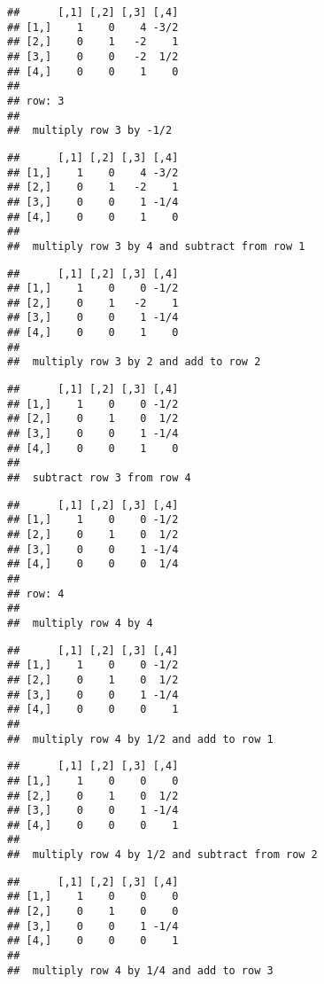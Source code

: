\documentclass[
  10pt,
  a4paper,
]{article}
\begin{document}
\begin{verbatim}
##      [,1] [,2] [,3] [,4]
## [1,]    1    0    4 -3/2
## [2,]    0    1   -2    1
## [3,]    0    0   -2  1/2
## [4,]    0    0    1    0
## 
## row: 3 
## 
##  multiply row 3 by -1/2
\end{verbatim}

\begin{verbatim}
##      [,1] [,2] [,3] [,4]
## [1,]    1    0    4 -3/2
## [2,]    0    1   -2    1
## [3,]    0    0    1 -1/4
## [4,]    0    0    1    0
## 
##  multiply row 3 by 4 and subtract from row 1
\end{verbatim}

\begin{verbatim}
##      [,1] [,2] [,3] [,4]
## [1,]    1    0    0 -1/2
## [2,]    0    1   -2    1
## [3,]    0    0    1 -1/4
## [4,]    0    0    1    0
## 
##  multiply row 3 by 2 and add to row 2
\end{verbatim}

\begin{verbatim}
##      [,1] [,2] [,3] [,4]
## [1,]    1    0    0 -1/2
## [2,]    0    1    0  1/2
## [3,]    0    0    1 -1/4
## [4,]    0    0    1    0
## 
##  subtract row 3 from row 4
\end{verbatim}

\begin{verbatim}
##      [,1] [,2] [,3] [,4]
## [1,]    1    0    0 -1/2
## [2,]    0    1    0  1/2
## [3,]    0    0    1 -1/4
## [4,]    0    0    0  1/4
## 
## row: 4 
## 
##  multiply row 4 by 4
\end{verbatim}

\begin{verbatim}
##      [,1] [,2] [,3] [,4]
## [1,]    1    0    0 -1/2
## [2,]    0    1    0  1/2
## [3,]    0    0    1 -1/4
## [4,]    0    0    0    1
## 
##  multiply row 4 by 1/2 and add to row 1
\end{verbatim}

\begin{verbatim}
##      [,1] [,2] [,3] [,4]
## [1,]    1    0    0    0
## [2,]    0    1    0  1/2
## [3,]    0    0    1 -1/4
## [4,]    0    0    0    1
## 
##  multiply row 4 by 1/2 and subtract from row 2
\end{verbatim}

\begin{verbatim}
##      [,1] [,2] [,3] [,4]
## [1,]    1    0    0    0
## [2,]    0    1    0    0
## [3,]    0    0    1 -1/4
## [4,]    0    0    0    1
## 
##  multiply row 4 by 1/4 and add to row 3
\end{verbatim}
\end{document}
